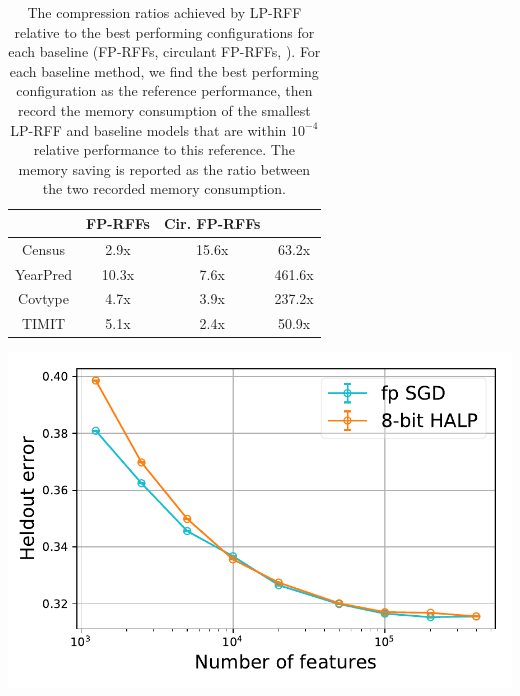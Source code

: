 \begin{table}[ht]
\begin{minipage}{.6\linewidth}
\centering
	\begin{tabular}{c c c c}
		\hline
		& FP-RFFs & Cir. FP-RFFs & \Nystrom \\
		\hline
		\hline
		Census & 2.9x & 15.6x & 63.2x \\
		YearPred & 10.3x & 7.6x & 461.6x \\ 
		Covtype & 4.7x & 3.9x & 237.2x \\ 
		TIMIT & 5.1x & 2.4x & 50.9x \\ 
		\hline
	\end{tabular}
	\caption{The compression ratios achieved by LP-RFF relative to the best performing configurations for each baseline (FP-RFFs, circulant FP-RFFs, \NystromNS). For each baseline method, we find the best performing configuration as the reference performance, then record the memory consumption of the smallest LP-RFF and baseline models that are within $10^{-4}$ relative performance to this reference. The memory saving is reported as the ratio between the two recorded memory consumption.}
	\label{tab:mem_saving}
\end{minipage}
\begin{minipage}{0.05\linewidth}	
\end{minipage}
\begin{minipage}{0.35\linewidth}
	\includegraphics[width=\linewidth]{figures/timit_error_vs_n_feat_lm_halp.pdf}

\end{minipage}
\end{table}
